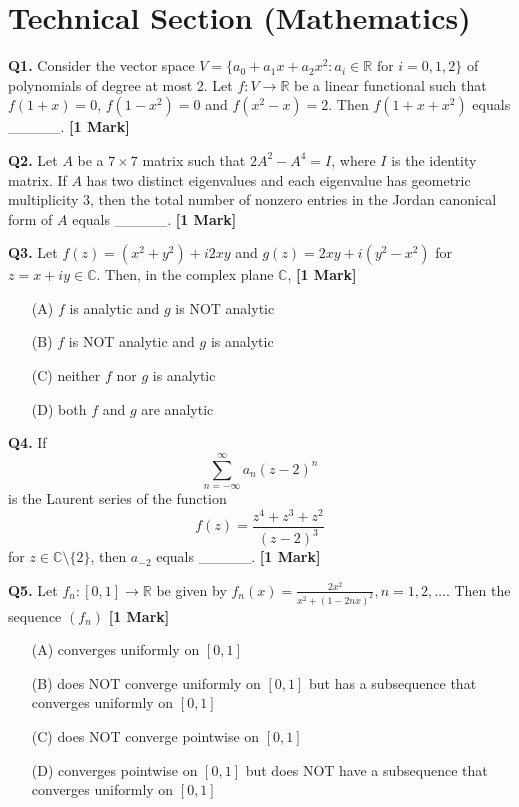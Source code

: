 \documentclass[11pt]{article}
\newcommand{\questiona}[2]{
    \noindent\textbf{Q#2.} #1 \hfill \textbf{[1 Mark]}
}
\begin{document}
\section*{Technical Section (Mathematics)}

\questiona{Consider the vector space \( V = \{a_0 + a_1 x + a_2 x^2 : a_i \in \mathbb{R} \text{ for } i = 0, 1, 2\} \) of polynomials of degree at most 2. Let \( f: V \to \mathbb{R} \) be a linear functional such that \( f(1+x) = 0 \), \( f(1-x^2) = 0 \) and \( f(x^2 - x) = 2 \). Then \( f(1+x+x^2) \) equals \_\_\_\_\_.}{1}
\vspace{0.5cm}

\questiona{Let \( A \) be a \( 7 \times 7 \) matrix such that \( 2A^2 - A^4 = I \), where \( I \) is the identity matrix. If \( A \) has two distinct eigenvalues and each eigenvalue has geometric multiplicity 3, then the total number of nonzero entries in the Jordan canonical form of \( A \) equals \_\_\_\_\_.}{2}
\vspace{0.5cm}

\questiona{Let \( f(z) = (x^2 + y^2) + i 2xy \) and \( g(z) = 2xy + i(y^2 - x^2) \) for \( z = x + iy \in \mathbb{C} \). Then, in the complex plane \( \mathbb{C} \),}{3}
\begin{enumerate}
    \item[(A)] \( f \) is analytic and \( g \) is NOT analytic  
    \item[(B)] \( f \) is NOT analytic and \( g \) is analytic  
    \item[(C)] neither \( f \) nor \( g \) is analytic  
    \item[(D)] both \( f \) and \( g \) are analytic  
\end{enumerate}
\vspace{0.5cm}

\questiona{If \[ \sum_{n=-\infty}^{\infty} a_n (z-2)^n \] is the Laurent series of the function \[ f(z) = \frac{z^4 + z^3 + z^2}{(z-2)^3} \] for \( z \in \mathbb{C} \setminus \{2\} \), then \( a_{-2} \) equals \_\_\_\_\_.}{4}
\vspace{0.5cm}

\questiona{Let \( f_n: [0,1] \to \mathbb{R} \) be given by \( f_n(x) = \frac{2x^2}{x^2 + (1 - 2nx)^2}, n = 1, 2, \ldots \). Then the sequence \( (f_n) \)}{5}
\begin{enumerate}
    \item[(A)] converges uniformly on \([0,1]\)  
    \item[(B)] does NOT converge uniformly on \([0,1]\) but has a subsequence that converges uniformly on \([0,1]\)  
    \item[(C)] does NOT converge pointwise on \([0,1]\)  
    \item[(D)] converges pointwise on \([0,1]\) but does NOT have a subsequence that converges uniformly on \([0,1]\)  
\end{enumerate}
\vspace{0.5cm}
\end{document}
